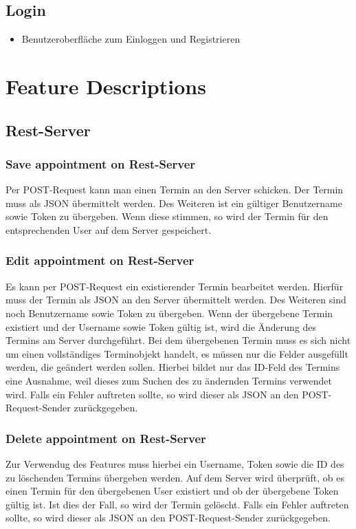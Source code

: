\documentclass[12pt]{scrartcl}
\begin{document}
    \subsection{Login}
    \begin{itemize}
        \item Benutzeroberfläche zum Einloggen und Registrieren
    \end{itemize}
    

    \section{Feature Descriptions}
    \subsection{Rest-Server}
    \subsubsection{Save appointment on Rest-Server}
        Per POST-Request kann man einen Termin an den Server schicken.
        Der Termin muss als JSON übermittelt werden. Des Weiteren ist ein gültiger Benutzername sowie Token zu übergeben.
        Wenn diese stimmen, so wird der Termin für den entsprechenden User auf dem Server gespeichert.
    
    \subsubsection{Edit appointment on Rest-Server}
        Es kann per POST-Request ein existierender Termin bearbeitet werden. Hierfür muss der Termin als JSON an den Server übermittelt werden.
        Des Weiteren sind noch Benutzername sowie Token zu übergeben. Wenn der übergebene Termin existiert und der Username sowie Token gültig ist, 
        wird die Änderung des Termins am Server durchgeführt. Bei dem übergebenen Termin muss es sich nicht um einen vollständiges Terminobjekt handelt, es 
        müssen nur die Felder ausgefüllt werden, die geändert werden sollen. Hierbei bildet nur das ID-Feld des Termins eine Ausnahme, weil dieses zum Suchen 
        des zu ändernden Termins verwendet wird.
        Falls ein Fehler auftreten sollte, so wird dieser als JSON an den POST-Request-Sender zurückgegeben.

    \subsubsection{Delete appointment on Rest-Server}
        Zur Verwendug des Features muss hierbei ein Username, Token sowie die ID des zu löschenden Termins übergeben werden.
        Auf dem Server wird überprüft, ob es einen Termin für den übergebenen User existiert und ob der übergebene Token gültig ist.
        Ist dies der Fall, so wird der Termin gelöscht.
        Falls ein Fehler auftreten sollte, so wird dieser als JSON an den POST-Request-Sender zurückgegeben.
    
\end{document}
